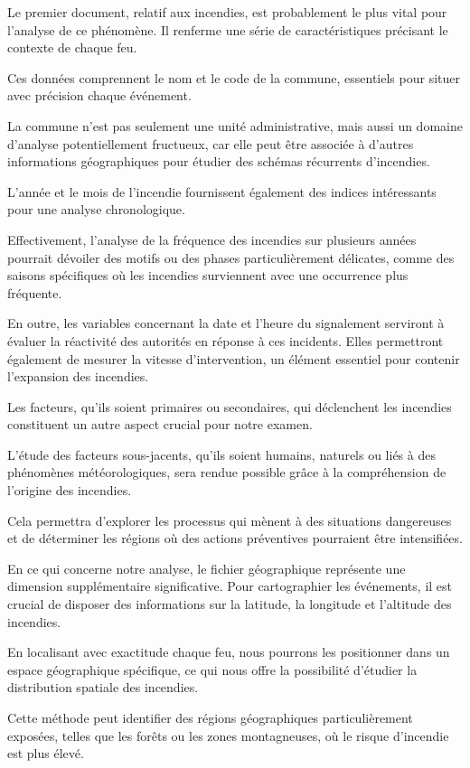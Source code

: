 \documentclass[
]{article}
\begin{document}
Le premier document, relatif aux incendies, est probablement le plus
vital pour l'analyse de ce phénomène. Il renferme une série de
caractéristiques précisant le contexte de chaque feu.

Ces données comprennent le nom et le code de la commune, essentiels pour
situer avec précision chaque événement.

La commune n'est pas seulement une unité administrative, mais aussi un
domaine d'analyse potentiellement fructueux, car elle peut être associée
à d'autres informations géographiques pour étudier des schémas
récurrents d'incendies.

L'année et le mois de l'incendie fournissent également des indices
intéressants pour une analyse chronologique.

Effectivement, l'analyse de la fréquence des incendies sur plusieurs
années pourrait dévoiler des motifs ou des phases particulièrement
délicates, comme des saisons spécifiques où les incendies surviennent
avec une occurrence plus fréquente.

En outre, les variables concernant la date et l'heure du signalement
serviront à évaluer la réactivité des autorités en réponse à ces
incidents. Elles permettront également de mesurer la vitesse
d'intervention, un élément essentiel pour contenir l'expansion des
incendies.

Les facteurs, qu'ils soient primaires ou secondaires, qui déclenchent
les incendies constituent un autre aspect crucial pour notre examen.

L'étude des facteurs sous-jacents, qu'ils soient humains, naturels ou
liés à des phénomènes météorologiques, sera rendue possible grâce à la
compréhension de l'origine des incendies.

Cela permettra d'explorer les processus qui mènent à des situations
dangereuses et de déterminer les régions où des actions préventives
pourraient être intensifiées.

En ce qui concerne notre analyse, le fichier géographique représente une
dimension supplémentaire significative. Pour cartographier les
événements, il est crucial de disposer des informations sur la latitude,
la longitude et l'altitude des incendies.

En localisant avec exactitude chaque feu, nous pourrons les positionner
dans un espace géographique spécifique, ce qui nous offre la possibilité
d'étudier la distribution spatiale des incendies.

Cette méthode peut identifier des régions géographiques particulièrement
exposées, telles que les forêts ou les zones montagneuses, où le risque
d'incendie est plus élevé.
\end{document}
